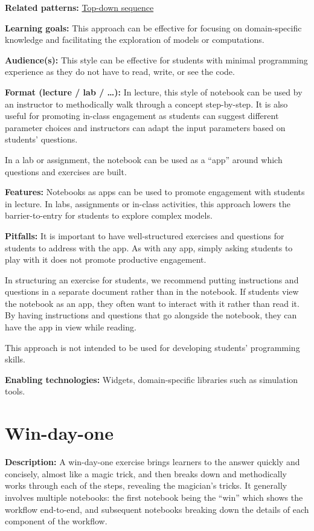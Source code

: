 \documentclass[]{book}
\begin{document}
\textbf{Related patterns:}
\protect\hyperlink{top-down-sequence}{Top-down sequence}

\textbf{Learning goals:}
This approach can be effective for focusing on domain-specific
knowledge and facilitating the exploration of models or computations.

\textbf{Audience(s):}
This style can be effective for students with minimal programming
experience as they do not have to read, write, or see the code.

\textbf{Format (lecture / lab / \ldots):}
In lecture, this style of notebook can be used by an instructor to
methodically walk through a concept step-by-step. It is also useful
for promoting in-class engagement as students can suggest different
parameter choices and instructors can adapt the input parameters based
on students' questions.

In a lab or assignment, the notebook can be used as a ``app'' around
which questions and exercises are built.

\textbf{Features:}
Notebooks as apps can be used to promote engagement with students in
lecture. In labs, assignments or in-class activities, this approach
lowers the barrier-to-entry for students to explore complex models.

\textbf{Pitfalls:}
It is important to have well-structured exercises and questions for
students to address with the app. As with any app, simply asking
students to play with it does not promote productive engagement.

In structuring an exercise for students, we recommend putting
instructions and questions in a separate document rather than in the
notebook. If students view the notebook as an app, they often want to
interact with it rather than read it. By having instructions and
questions that go alongside the notebook, they can have the app in
view while reading.

This approach is not intended to be used for developing students'
programming skills.

\textbf{Enabling technologies:}
Widgets, domain-specific libraries such as simulation tools.

\hypertarget{win-day-one}{%
\section{Win-day-one}\label{win-day-one}}

\textbf{Description:}
A win-day-one exercise brings learners to the answer quickly and
concisely, almost like a magic trick, and then breaks down and
methodically works through each of the steps, revealing the magician's
tricks. It generally involves multiple notebooks: the first notebook
being the ``win'' which shows the workflow end-to-end, and subsequent
notebooks breaking down the details of each component of the workflow.
\end{document}
